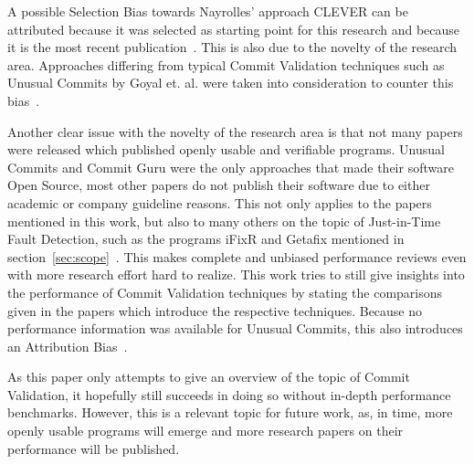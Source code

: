 A possible Selection Bias towards Nayrolles' approach CLEVER can be attributed because it was selected as starting point for this research and because it is the most recent publication~\cite{Nayrolles2018}. This is also due to the novelty of the research area. Approaches differing from typical Commit Validation techniques such as Unusual Commits by Goyal et. al. were taken into consideration to counter this bias~\cite{Goyal2017}.

Another clear issue with the novelty of the research area is that not many papers were released which published openly usable and verifiable programs. Unusual Commits and Commit Guru were the only approaches that made their software Open Source, most other papers do not publish their software due to either academic or company guideline reasons. This not only applies to the papers mentioned in this work, but also to many others on the topic of Just-in-Time Fault Detection, such as the programs iFixR and Getafix mentioned in section~\ref{sec:scope}~\cite{Koyuncu2019,Bader2019}. This makes complete and unbiased performance reviews even with more research effort hard to realize. This work tries to still give insights into the performance of Commit Validation techniques by stating the comparisons given in the papers which introduce the respective techniques. Because no performance information was available for Unusual Commits, this also introduces an Attribution Bias~\cite{Goyal2017}.

As this paper only attempts to give an overview of the topic of Commit Validation, it hopefully still succeeds in doing so without in-depth performance benchmarks. However, this is a relevant topic for future work, as, in time, more openly usable programs will emerge and more research papers on their performance will be published.





